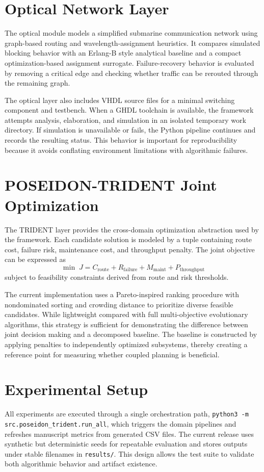 \documentclass[conference]{IEEEtran}
\begin{document}
\section{Optical Network Layer}
The optical module models a simplified submarine communication network using graph-based routing and wavelength-assignment heuristics. It compares simulated blocking behavior with an Erlang-B style analytical baseline and a compact optimization-based assignment surrogate. Failure-recovery behavior is evaluated by removing a critical edge and checking whether traffic can be rerouted through the remaining graph.

The optical layer also includes VHDL source files for a minimal switching component and testbench. When a GHDL toolchain is available, the framework attempts analysis, elaboration, and simulation in an isolated temporary work directory. If simulation is unavailable or fails, the Python pipeline continues and records the resulting status. This behavior is important for reproducibility because it avoids conflating environment limitations with algorithmic failures.

\section{POSEIDON-TRIDENT Joint Optimization}
The TRIDENT layer provides the cross-domain optimization abstraction used by the framework. Each candidate solution is modeled by a tuple containing route cost, failure risk, maintenance cost, and throughput penalty. The joint objective can be expressed as
\begin{equation}
\min \; J = C_{\text{route}} + R_{\text{failure}} + M_{\text{maint}} + P_{\text{throughput}}
\end{equation}
subject to feasibility constraints derived from route and risk thresholds.

The current implementation uses a Pareto-inspired ranking procedure with nondominated sorting and crowding distance to prioritize diverse feasible candidates. While lightweight compared with full multi-objective evolutionary algorithms, this strategy is sufficient for demonstrating the difference between joint decision making and a decomposed baseline. The baseline is constructed by applying penalties to independently optimized subsystems, thereby creating a reference point for measuring whether coupled planning is beneficial.

\section{Experimental Setup}
All experiments are executed through a single orchestration path, \texttt{python3 -m src.poseidon\_trident.run\_all}, which triggers the domain pipelines and refreshes manuscript metrics from generated CSV files. The current release uses synthetic but deterministic seeds for repeatable evaluation and stores outputs under stable filenames in \texttt{results/}. This design allows the test suite to validate both algorithmic behavior and artifact existence.
\end{document}
